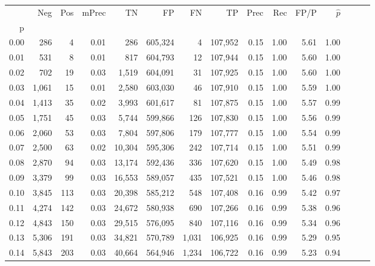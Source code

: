 \begin{tabular}{rrrrrrrrrrrrrrr}
\toprule
{} &     Neg &    Pos & mPrec &       TN &       FP &       FN &       TP &  Prec &   Rec &  FP/P & $\hat{p}$ \\
p    &         &        &       &          &          &          &          &       &       &       &           \\
\midrule
0.00 &     286 &      4 &  0.01 &      286 &  605,324 &        4 &  107,952 &  0.15 &  1.00 &  5.61 &      1.00 \\
0.01 &     531 &      8 &  0.01 &      817 &  604,793 &       12 &  107,944 &  0.15 &  1.00 &  5.60 &      1.00 \\
0.02 &     702 &     19 &  0.03 &    1,519 &  604,091 &       31 &  107,925 &  0.15 &  1.00 &  5.60 &      1.00 \\
0.03 &   1,061 &     15 &  0.01 &    2,580 &  603,030 &       46 &  107,910 &  0.15 &  1.00 &  5.59 &      1.00 \\
0.04 &   1,413 &     35 &  0.02 &    3,993 &  601,617 &       81 &  107,875 &  0.15 &  1.00 &  5.57 &      0.99 \\
0.05 &   1,751 &     45 &  0.03 &    5,744 &  599,866 &      126 &  107,830 &  0.15 &  1.00 &  5.56 &      0.99 \\
0.06 &   2,060 &     53 &  0.03 &    7,804 &  597,806 &      179 &  107,777 &  0.15 &  1.00 &  5.54 &      0.99 \\
0.07 &   2,500 &     63 &  0.02 &   10,304 &  595,306 &      242 &  107,714 &  0.15 &  1.00 &  5.51 &      0.99 \\
0.08 &   2,870 &     94 &  0.03 &   13,174 &  592,436 &      336 &  107,620 &  0.15 &  1.00 &  5.49 &      0.98 \\
0.09 &   3,379 &     99 &  0.03 &   16,553 &  589,057 &      435 &  107,521 &  0.15 &  1.00 &  5.46 &      0.98 \\
0.10 &   3,845 &    113 &  0.03 &   20,398 &  585,212 &      548 &  107,408 &  0.16 &  0.99 &  5.42 &      0.97 \\
0.11 &   4,274 &    142 &  0.03 &   24,672 &  580,938 &      690 &  107,266 &  0.16 &  0.99 &  5.38 &      0.96 \\
0.12 &   4,843 &    150 &  0.03 &   29,515 &  576,095 &      840 &  107,116 &  0.16 &  0.99 &  5.34 &      0.96 \\
0.13 &   5,306 &    191 &  0.03 &   34,821 &  570,789 &    1,031 &  106,925 &  0.16 &  0.99 &  5.29 &      0.95 \\
0.14 &   5,843 &    203 &  0.03 &   40,664 &  564,946 &    1,234 &  106,722 &  0.16 &  0.99 &  5.23 &      0.94 \\

\end{tabular}
